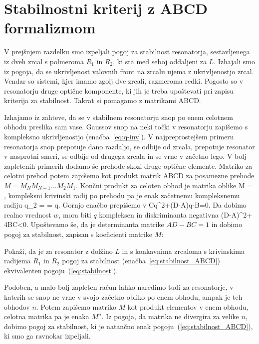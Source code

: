 \section{Stabilnostni kriterij z ABCD formalizmom}
V prejšnjem razdelku smo izpeljali pogoj za stabilnost resonatorja, 
sestavljenega iz dveh zrcal s polmeroma $R_1$ in $R_2$, ki sta med 
seboj oddaljeni za $L$. Izhajali smo iz pogoja, da se ukrivljenost
valovnih front na zrcalu ujema z ukrivljenostjo zrcal. Vendar so sistemi,
kjer imamo zgolj dve zrcali, razmeroma redki. Pogosto so v resonatorju
druge optične komponente, ki jih je treba upoštevati pri zapisu
kriterija za stabilnost. Takrat si pomagamo z matrikami ABCD. 

Izhajamo iz zahteve, da se v stabilnem resonatorju snop po enem celotnem obhodu
preslika sam vase. Gaussov snop na neki točki v resonatorju 
zapišemo s kompleksno ukrivljenostjo (enačba~\ref{eq:q-inv}).
V najpreprostejšem primeru resonatorja snop prepotuje dano razdaljo, se odbije od zrcala, prepotuje
resonator v nasprotni smeri, se odbije od drugega zrcala in se vrne v začetno lego. V bolj 
zapletenih primerih dodamo še prehode skozi druge optične elemente. Matriko 
za celotni prehod potem zapišemo kot produkt matrik ABCD za posamezne prehode $M = M_N M_{N-1} ...M_2 M_1$.
Končni produkt za celoten obhod je matrika oblike
\beq
M = \left[\begin{array}{cc}
A & B\\
C & D
\end{array}\right],
\eeq
kompleksni krivinski radij po prehodu pa je enak začetnemu kompleksnemu radiju
\beq
q_2 =  = q.
\eeq
Gornjo enačbo prepišemo v 
\beq
Cq^2+(D-A)q-B=0.
\eeq
Da dobimo realno vrednost $w$, mora biti $q$ kompleksen in diskriminanta negativna
\beq
(D-A)^2+ 4BC<0.
\eeq
Upoštevamo še, da je determinanta matrike $AD-BC=1$ in dobimo pogoj za 
stabilnost, zapisan s koeficienti matrike $M$:

\begin{definition}
Pokaži, da je za resonator z dolžino $L$ in s konkavnima zrcaloma s krivinskima radijema $R_1$ in $R_2$ 
pogoj za stabilnost (enačba~\ref{eq:stabilnost_ABCD}) ekvivalenten pogoju~(\ref{eq:stabilnost}).
\end{definition}

\begin{remark}
Podoben, a malo bolj zapleten račun lahko naredimo tudi za resonatorje, v katerih se snop 
ne vrne v svojo začetno obliko po enem obhodu, ampak je teh obhodov $n$. Potem zapišemo
matriko $M$ kot produkt elementov v enem obhodu, celotna matrika pa je enaka $M^n$. Iz pogoja,
da matrika ne divergira za velike $n$, dobimo pogoj za stabilnost, ki je natančno 
enak pogoju~(\ref{eq:stabilnost_ABCD}), ki smo ga ravnokar izpeljali. 
\end{remark}

